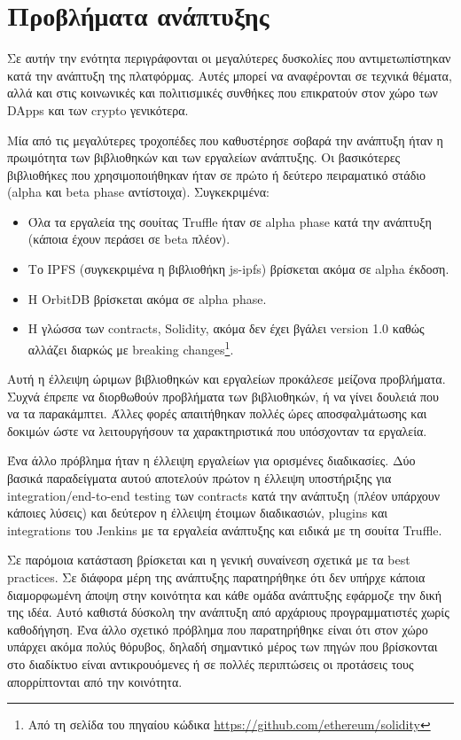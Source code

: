 \section{Προβλήματα ανάπτυξης} \label{section:4-4-problems-faced}

Σε αυτήν την ενότητα περιγράφονται οι μεγαλύτερες δυσκολίες που αντιμετωπίστηκαν κατά την ανάπτυξη της πλατφόρμας. Αυτές μπορεί να αναφέρονται σε τεχνικά θέματα, αλλά και στις κοινωνικές και πολιτισμικές συνθήκες που επικρατούν στον χώρο των DApps και των crypto γενικότερα.

Μία από τις μεγαλύτερες τροχοπέδες που καθυστέρησε σοβαρά την ανάπτυξη ήταν η πρωιμότητα των βιβλιοθηκών και των εργαλείων ανάπτυξης. Οι βασικότερες βιβλιοθήκες που χρησιμοποιήθηκαν ήταν σε πρώτο ή δεύτερο πειραματικό στάδιο (alpha και beta phase αντίστοιχα). Συγκεκριμένα:

\begin{itemize}
	\item Όλα τα εργαλεία της σουίτας Truffle ήταν σε alpha phase κατά την ανάπτυξη (κάποια έχουν περάσει σε beta πλέον).
	\item Το IPFS (συγκεκριμένα η βιβλιοθήκη js-ipfs) βρίσκεται ακόμα σε alpha έκδοση.
	\item Η OrbitDB βρίσκεται ακόμα σε alpha phase.
	\item Η γλώσσα των contracts, Solidity, ακόμα δεν έχει βγάλει version 1.0 καθώς αλλάζει διαρκώς με breaking changes\footnote{Από τη σελίδα του πηγαίου κώδικα \url{https://github.com/ethereum/solidity}}.
\end{itemize}

Αυτή η έλλειψη ώριμων βιβλιοθηκών και εργαλείων προκάλεσε μείζονα προβλήματα. Συχνά έπρεπε να διορθωθούν προβλήματα των βιβλιοθηκών, ή να γίνει δουλειά που να τα παρακάμπτει. Άλλες φορές απαιτήθηκαν πολλές ώρες αποσφαλμάτωσης και δοκιμών ώστε να λειτουργήσουν τα χαρακτηριστικά που υπόσχονταν τα εργαλεία.

Ένα άλλο πρόβλημα ήταν η έλλειψη εργαλείων για ορισμένες διαδικασίες. Δύο βασικά παραδείγματα αυτού αποτελούν πρώτον η έλλειψη υποστήριξης για integration/end-to-end testing των contracts κατά την ανάπτυξη (πλέον υπάρχουν κάποιες λύσεις) και δεύτερον η έλλειψη έτοιμων διαδικασιών, plugins και integrations του Jenkins με τα εργαλεία ανάπτυξης και ειδικά με τη σουίτα Truffle.

Σε παρόμοια κατάσταση βρίσκεται και η γενική συναίνεση σχετικά με τα best practices. Σε διάφορα μέρη της ανάπτυξης παρατηρήθηκε ότι δεν υπήρχε κάποια διαμορφωμένη άποψη στην κοινότητα και κάθε ομάδα ανάπτυξης εφάρμοζε την δική της ιδέα. Αυτό καθιστά δύσκολη την ανάπτυξη από αρχάριους προγραμματιστές χωρίς καθοδήγηση. Ένα άλλο σχετικό πρόβλημα που παρατηρήθηκε είναι ότι στον χώρο υπάρχει ακόμα πολύς θόρυβος, δηλαδή σημαντικό μέρος των πηγών που βρίσκονται στο διαδίκτυο είναι αντικρουόμενες ή σε πολλές περιπτώσεις οι προτάσεις τους απορρίπτονται από την κοινότητα.

